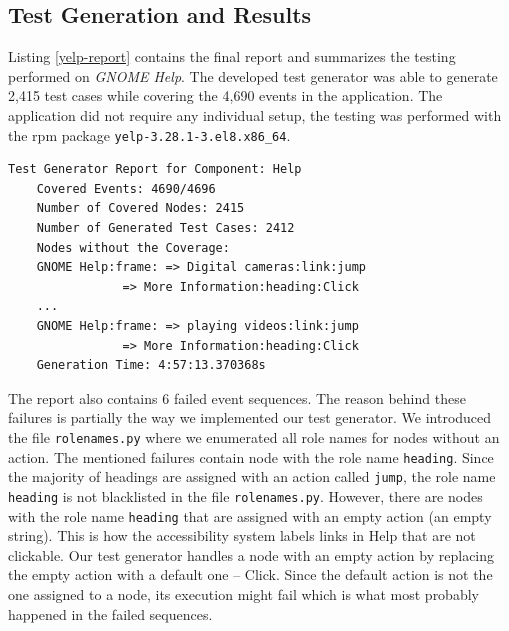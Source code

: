 \subsection{Test Generation and Results}\label{firefox_bug}
Listing \ref{yelp-report} contains the final report and summarizes the testing performed on \textit{GNOME Help}. The developed test generator was able to generate 2,415 test cases while covering the 4,690 events in the application. The application did not require any individual setup, the testing was performed with the rpm package \texttt{yelp-3.28.1-3.el8.x86\_64}.

\begin{lstlisting}[caption={
Final test generator report for GNOME Help},label={yelp-report}]
    Test Generator Report for Component: Help
    Covered Events: 4690/4696
    Number of Covered Nodes: 2415
    Number of Generated Test Cases: 2412
    Nodes without the Coverage:
    GNOME Help:frame: => Digital cameras:link:jump 
                => More Information:heading:Click
    ...
    GNOME Help:frame: => playing videos:link:jump
                => More Information:heading:Click 
    Generation Time: 4:57:13.370368s
\end{lstlisting}

The report also contains 6 failed event sequences. The reason behind these failures is partially the way we implemented our test generator. We introduced the file \texttt{rolenames.py} where we enumerated all role names for nodes without an action. The mentioned failures contain node with the role name \texttt{heading}. Since the majority of headings are assigned with an action called \texttt{jump}, the role name \texttt{heading} is not blacklisted in the file \texttt{rolenames.py}. However, there are nodes with the role name \texttt{heading} that are assigned with an empty action (an empty string). This is how the accessibility system labels links in Help that are not clickable. Our test generator handles a node with an empty action by replacing the empty action with a default one -- Click. Since the default action is not the one assigned to a node, its execution might fail which is what most probably happened in the failed sequences. 

